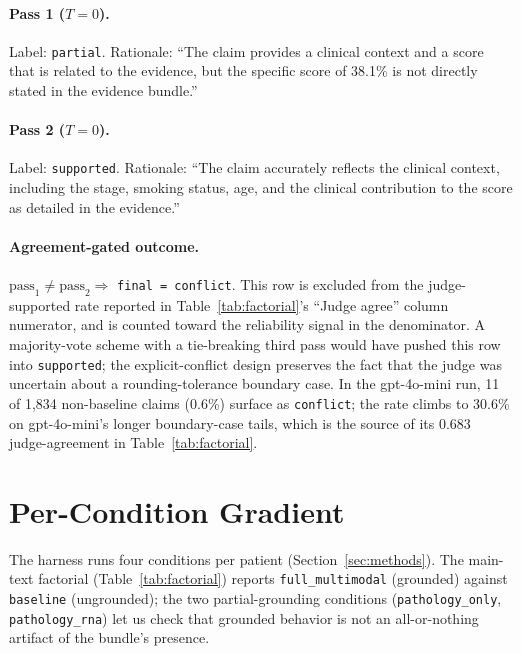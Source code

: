 \documentclass{article}
\theoremstyle{plain}
\begin{document}
\paragraph{Pass 1 ($T{=}0$).} Label: \texttt{partial}. Rationale: ``The claim provides a clinical context and a score that is related to the evidence, but the specific score of 38.1\% is not directly stated in the evidence bundle.''

\paragraph{Pass 2 ($T{=}0$).} Label: \texttt{supported}. Rationale: ``The claim accurately reflects the clinical context, including the stage, smoking status, age, and the clinical contribution to the score as detailed in the evidence.''

\paragraph{Agreement-gated outcome.} $\text{pass}_1 \ne \text{pass}_2 \Rightarrow$ \texttt{final = conflict}. This row is excluded from the judge-supported rate reported in Table~\ref{tab:factorial}'s ``Judge agree'' column numerator, and is counted toward the reliability signal in the denominator. A majority-vote scheme with a tie-breaking third pass would have pushed this row into \texttt{supported}; the explicit-conflict design preserves the fact that the judge was uncertain about a rounding-tolerance boundary case. In the gpt-4o-mini run, 11 of 1{,}834 non-baseline claims (0.6\%) surface as \texttt{conflict}; the rate climbs to 30.6\% on gpt-4o-mini's longer boundary-case tails, which is the source of its 0.683 judge-agreement in Table~\ref{tab:factorial}.

\section{Per-Condition Gradient}
\label{app:conditions}

The harness runs four conditions per patient (Section~\ref{sec:methods}). The main-text factorial (Table~\ref{tab:factorial}) reports \texttt{full\_multimodal} (grounded) against \texttt{baseline} (ungrounded); the two partial-grounding conditions (\texttt{pathology\_only}, \texttt{pathology\_rna}) let us check that grounded behavior is not an all-or-nothing artifact of the bundle's presence.
\end{document}
